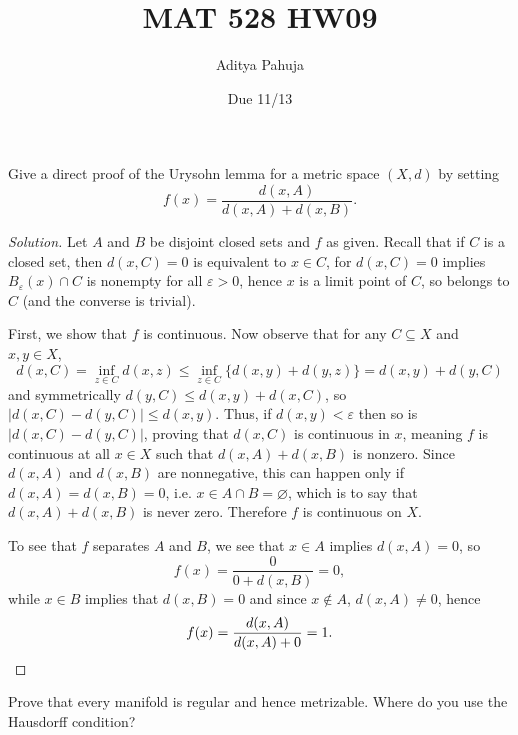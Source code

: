 \documentclass[10pt]{article}
\title{MAT 528 HW09}
\author{\large Aditya Pahuja}
\date{\large Due 11/13}
\providecommand{\eps}{\varepsilon}
\newenvironment{soln}{\begin{proof}[Solution]}{\end{proof}}
\providecommand{\abs}[1]{\left\lvert #1\right\rvert}
\begin{document}
\maketitle

\begin{problem}
    [Munkres 33.3]
    Give a direct proof of the Urysohn lemma
    for a metric space $(X,d)$ by setting
    \begin{equation*}
	f(x) = \frac{d(x,A)}{d(x,A) + d(x,B)}.
    \end{equation*}
\end{problem}

\begin{soln}
    Let $A$ and $B$ be disjoint closed sets and $f$ as given.
    Recall that if $C$ is a closed set, then $d(x,C) = 0$
    is equivalent to $x\in C$, for $d(x,C) = 0$ implies
    $B_\eps(x)\cap C$ is nonempty for all $\eps>0$,
    hence $x$ is a limit point of $C$, so belongs to $C$
    (and the converse is trivial).

    First, we show that $f$ is continuous.
    Now observe that for any $C\subseteq X$ and $x,y\in X$,
    \begin{equation*}
	d(x,C) = \inf_{z\in C} d(x,z) \le \inf_{z\in C}\{d(x,y) + d(y,z)\}
	= d(x,y) + d(y,C)
    \end{equation*}
    and symmetrically $d(y,C) \le d(x,y) + d(x,C)$,
    so $\abs{d(x,C) - d(y,C)} \le d(x,y)$.
    Thus, if $d(x,y) < \eps$ then so is $\abs{d(x,C) - d(y,C)}$,
    proving that $d(x,C)$ is continuous in $x$,
    meaning $f$ is continuous at all $x\in X$ such that $d(x,A) + d(x,B)$ is nonzero.
    Since $d(x,A)$ and $d(x,B)$ are nonnegative,
    this can happen only if $d(x,A) = d(x,B) = 0$,
    i.e. $x\in A\cap B = \varnothing$, which is to say that
    $d(x,A) + d(x,B)$ is never zero. Therefore $f$ is continuous on $X$.

    To see that $f$ separates $A$ and $B$, we see that
    $x\in A$ implies $d(x,A) = 0$, so
    \begin{equation*}
	f(x) = \frac{0}{0 + d(x,B)} = 0,
    \end{equation*}
    while $x\in B$ implies that $d(x,B) = 0$ and since $x\notin A$,
    $d(x,A)\ne 0$, hence
    \begin{equation*}
	f(x) = \frac{d(x,A)}{d(x,A) + 0} = 1.\qedhere
    \end{equation*}
\end{soln}

\begin{problem}
    [Munkres 36.1]
    Prove that every manifold is regular and hence metrizable.
    Where do you use the Hausdorff condition?
\end{problem}
\end{document}
